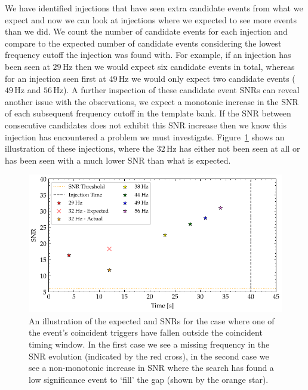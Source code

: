 We have identified injections that have seen extra candidate events from what we expect and now we can look at injections where we expected to see more events than we did. We count the number of candidate events for each injection and compare to the expected number of candidate events considering the lowest frequency cutoff the injection was found with. For example, if an injection has been seen at $29 \, \text{Hz}$ then we would expect six candidate events in total, whereas for an injection seen first at $49 \, \text{Hz}$ we would only expect two candidate events ($49 \, \text{Hz}$ and $56 \, \text{Hz}$). A further inspection of these candidate event SNRs can reveal another issue with the observations, we expect a monotonic increase in the SNR of each subsequent frequency cutoff in the template bank. If the SNR between consecutive candidates does not exhibit this SNR increase then we know this injection has encountered a problem we must investigate. Figure~\ref{6:fig:non-monotonic-snr} shows an illustration of these injections, where the 
$32 \, \text{Hz}$ has either not been seen at all or has been seen with a much lower SNR than what is expected.

\begin{figure}
       \centering
    \includegraphics[width=\textwidth]{images/6_earlywarning/identified-problems/non_mono_snr.pdf}
    \caption{An illustration of the expected and SNRs for the case where one of the event's coincident triggers have fallen outside the coincident timing window. In the first case we see a missing frequency in the SNR evolution (indicated by the red cross), in the second case we see a non-monotonic increase in SNR where the search has found a low significance event to `fill' the gap (shown by the orange star).}
    \label{6:fig:non-monotonic-snr}
\end{figure}

